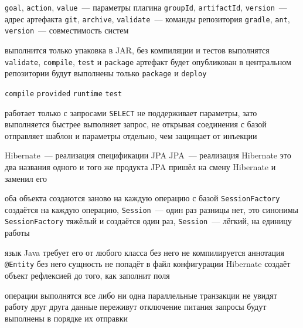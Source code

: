 \begin{enumerate}

  {\texttt{goal}, \texttt{action}, \texttt{value}~--- параметры плагина}
  {\texttt{groupId}, \texttt{artifactId}, \texttt{version}~--- адрес артефакта}
  {\texttt{git}, \texttt{archive}, \texttt{validate}~--- команды репозитория}
  {\texttt{gradle}, \texttt{ant}, \texttt{version}~--- совместимость систем}

  {выполнится только упаковка в JAR, без компиляции и тестов}
  {выполнятся \texttt{validate}, \texttt{compile}, \texttt{test} и \texttt{package}}
  {артефакт будет опубликован в центральном репозитории}
  {будут выполнены только \texttt{package} и \texttt{deploy}}

  {\texttt{compile}}
  {\texttt{provided}}
  {\texttt{runtime}}
  {\texttt{test}}

  {работает только с запросами \texttt{SELECT}}
  {не поддерживает параметры, зато выполняется быстрее}
  {выполняет запрос, не открывая соединения с базой}
  {отправляет шаблон и параметры отдельно, чем защищает от инъекции}

  {Hibernate~--- реализация спецификации JPA}
  {JPA~--- реализация Hibernate}
  {это два названия одного и того же продукта}
  {JPA пришёл на смену Hibernate и заменил его}

  {оба объекта создаются заново на каждую операцию с базой}
  {\texttt{SessionFactory} создаётся на каждую операцию, \texttt{Session}~--- один раз}
  {разницы нет, это синонимы}
  {\texttt{SessionFactory} тяжёлый и создаётся один раз, \texttt{Session}~--- лёгкий, на единицу работы}

  {язык Java требует его от любого класса}
  {без него не компилируется аннотация \texttt{@Entity}}
  {без него сущность не попадёт в файл конфигурации}
  {Hibernate создаёт объект рефлексией до того, как заполнит поля}

  {операции выполнятся все либо ни одна}
  {параллельные транзакции не увидят работу друг друга}
  {данные переживут отключение питания}
  {запросы будут выполнены в порядке их отправки}


\end{enumerate}
